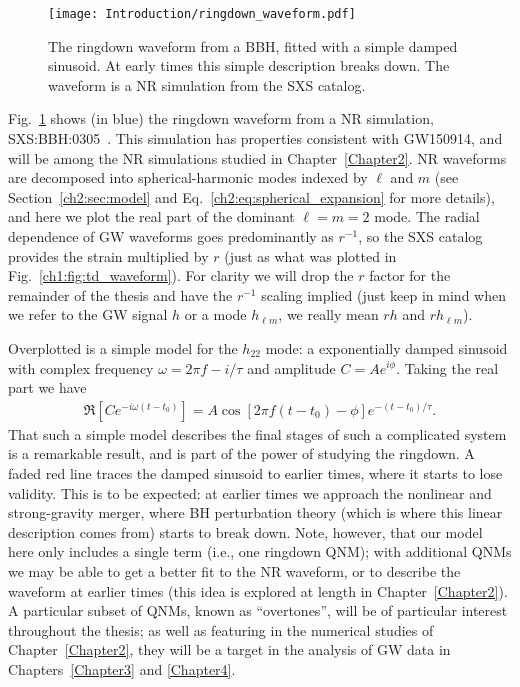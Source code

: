 \begin{figure}[ht!]
    \centering
    \texttt{[image: Introduction/ringdown\_waveform.pdf]}
    \caption[The gravitational-wave ringdown signal]{ 
    The ringdown waveform from a BBH, fitted with a simple damped sinusoid. 
    At early times this simple description breaks down. The waveform is a NR simulation from the SXS catalog.
    }
    \label{ch1:fig:rd_waveform}
\end{figure}

Fig.~\ref{ch1:fig:rd_waveform} shows (in blue) the ringdown waveform from a NR simulation, SXS:BBH:0305~\cite{Lovelace:2016uwp}.
This simulation has properties consistent with GW150914, and will be among the NR simulations studied in Chapter~\ref{Chapter2}.
NR waveforms are decomposed into spherical-harmonic modes indexed by $\ell$ and $m$ (see Section~\ref{ch2:sec:model} and Eq.~\ref{ch2:eq:spherical_expansion} for more details), and here we plot the real part of the dominant $\ell = m = 2$ mode.
The radial dependence of GW waveforms goes predominantly as $r^{-1}$, so the SXS catalog provides the strain multiplied by $r$ (just as what was plotted in Fig.~\ref{ch1:fig:td_waveform}).
For clarity we will drop the $r$ factor for the remainder of the thesis and have the $r^{-1}$ scaling implied (just keep in mind when we refer to the GW signal $h$ or a mode $h_{\ell m}$, we really mean $rh$ and $rh_{\ell m}$). 

Overplotted is a simple model for the $h_{22}$ mode: a exponentially damped sinusoid with complex frequency $\omega = 2\pi f - i/\tau$ and amplitude $C = Ae^{i\phi}$. 
Taking the real part we have
\begin{align}
    \Re[Ce^{-i\omega(t-t_0)}] = A\cos[2\pi f(t-t_0) - \phi]e^{-(t-t_0)/\tau}.
\end{align}
That such a simple model describes the final stages of such a complicated system is a remarkable result, and is part of the power of studying the ringdown.
A faded red line traces the damped sinusoid to earlier times, where it starts to lose validity.
This is to be expected: at earlier times we approach the nonlinear and strong-gravity merger, where BH perturbation theory (which is where this linear description comes from) starts to break down.
Note, however, that our model here only includes a single term (i.e., one ringdown QNM); with additional QNMs we may be able to get a better fit to the NR waveform, or to describe the waveform at earlier times (this idea is explored at length in Chapter~\ref{Chapter2}).
A particular subset of QNMs, known as ``overtones'', will be of particular interest throughout the thesis; as well as featuring in the numerical studies of Chapter~\ref{Chapter2}, they will be a target in the analysis of GW data in Chapters~\ref{Chapter3} and \ref{Chapter4}.

